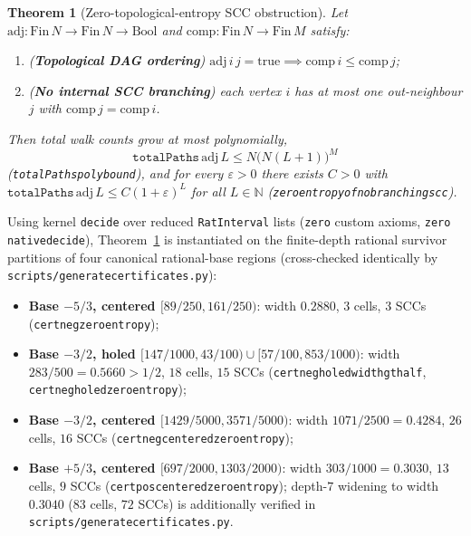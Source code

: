\documentclass[11pt,a4paper]{article}
\newtheorem{theorem}{Theorem}[section]
\theoremstyle{remark}
\newcommand{\N}{\mathbb{N}}
\renewcommand{\_}{\textunderscore\allowbreak}
\newcommand{\lean}[1]{\texttt{#1}}
\begin{document}
\begin{theorem}[Zero-topological-entropy SCC obstruction]
\label{thm:zeroentropy}
Let $\mathrm{adj}:\mathrm{Fin}\,N\to\mathrm{Fin}\,N\to\mathrm{Bool}$ and $\mathrm{comp}:\mathrm{Fin}\,N\to\mathrm{Fin}\,M$ satisfy:
\begin{enumerate}[leftmargin=1.5em]
  \item (\textbf{Topological DAG ordering}) $\mathrm{adj}\,i\,j=\mathrm{true}\implies \mathrm{comp}\,i\le \mathrm{comp}\,j$;
  \item (\textbf{No internal SCC branching}) each vertex $i$ has at most one out-neighbour $j$ with $\mathrm{comp}\,j=\mathrm{comp}\,i$.
\end{enumerate}
Then total walk counts grow at most polynomially,
\[
  \lean{totalPaths}\,\mathrm{adj}\,L\le N\bigl(N(L+1)\bigr)^M
\]
(\lean{totalPaths\_poly\_bound}), and for every $\varepsilon>0$ there exists $C>0$ with $\lean{totalPaths}\,\mathrm{adj}\,L\le C(1+\varepsilon)^L$ for all $L\in\N$ (\lean{zero\_entropy\_of\_no\_branching\_scc}).
\end{theorem}

Using kernel \lean{decide} over reduced \lean{RatInterval} lists (\lean{zero} custom axioms, \lean{zero} \lean{native\_decide}), Theorem~\ref{thm:zeroentropy} is instantiated on the finite-depth rational survivor partitions of four canonical rational-base regions (cross-checked identically by \lean{scripts/generate\_certificates.py}):
\begin{itemize}[leftmargin=1.4em]
  \item \textbf{Base $-5/3$, centered $[89/250,161/250)$}: width $0.2880$, $3$ cells, $3$ SCCs (\lean{cert\_neg\_5\_3\_zero\_entropy});
  \item \textbf{Base $-3/2$, holed $[147/1000,43/100)\cup[57/100,853/1000)$}: width $283/500=0.5660>1/2$, $18$ cells, $15$ SCCs (\lean{cert\_neg\_3\_2\_holed\_width\_gt\_half}, \lean{cert\_neg\_3\_2\_holed\_zero\_entropy});
  \item \textbf{Base $-3/2$, centered $[1429/5000,3571/5000)$}: width $1071/2500=0.4284$, $26$ cells, $16$ SCCs (\lean{cert\_neg\_3\_2\_centered\_zero\_entropy});
  \item \textbf{Base $+5/3$, centered $[697/2000,1303/2000)$}: width $303/1000=0.3030$, $13$ cells, $9$ SCCs (\lean{cert\_pos\_5\_3\_centered\_zero\_entropy}); depth-$7$ widening to width $0.3040$ ($83$ cells, $72$ SCCs) is additionally verified in \lean{scripts/generate\_certificates.py}.
\end{itemize}
\end{document}
